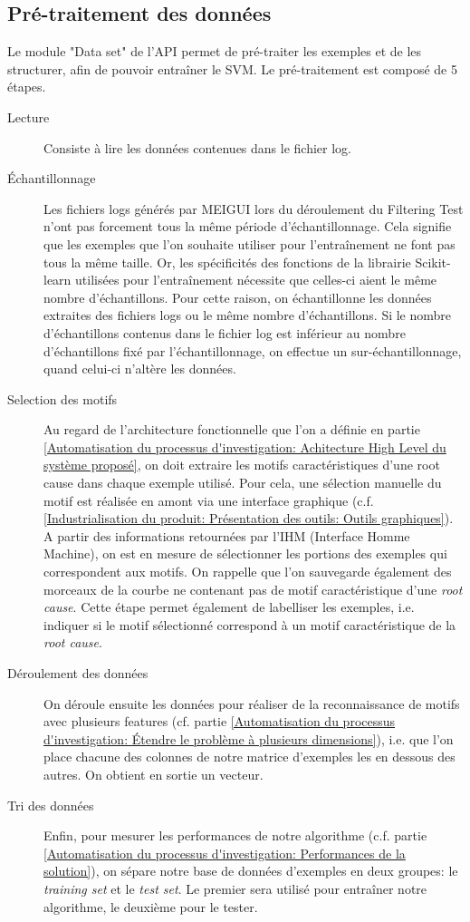 \subsection{Pré-traitement des données}
\label{Industrialisation du produit: API: Pré-traitement et traitement des données}
Le module "Data set" de l'API permet de pré-traiter les exemples et de les structurer, afin de pouvoir entraîner le SVM. 
Le pré-traitement est composé de 5 étapes.
\begin{description}
	\item [Lecture] Consiste à lire les données contenues dans le fichier log. 
	\item [Échantillonnage] Les fichiers logs générés par MEIGUI lors du déroulement du Filtering Test n'ont pas forcement tous la même période d'échantillonnage. Cela signifie que les exemples que l'on souhaite utiliser pour l'entraînement ne font pas tous la même taille. Or, les spécificités des fonctions de la librairie Scikit-learn utilisées pour l'entraînement nécessite que celles-ci aient le même nombre d'échantillons. Pour cette raison, on échantillonne les données extraites des fichiers logs ou le même nombre d'échantillons. Si le nombre d'échantillons contenus dans le fichier log est inférieur au nombre d'échantillons fixé par l'échantillonnage, on effectue un sur-échantillonnage, quand celui-ci n'altère les données. 
	\item [Selection des motifs] Au regard de l'architecture fonctionnelle que l'on a définie en partie \ref{Automatisation du processus d'investigation: Achitecture High Level du système proposé}, on doit extraire les motifs caractéristiques d'une root cause dans chaque exemple utilisé. Pour cela, une sélection manuelle du motif est réalisée en amont via une interface graphique (c.f. \ref{Industrialisation du produit: Présentation des outils: Outils graphiques}). A partir des informations retournées par l'IHM (Interface Homme Machine), on est en mesure de sélectionner les portions des exemples qui correspondent aux motifs. On rappelle que l'on sauvegarde également des morceaux de la courbe ne contenant pas de motif caractéristique d'une \emph{root cause}. Cette étape permet également de labelliser les exemples, i.e. indiquer si le motif sélectionné correspond à un motif caractéristique de la \emph{root cause}.
	\item [Déroulement des données] On déroule ensuite les données pour réaliser de la reconnaissance de motifs avec plusieurs features (cf. partie \ref{Automatisation du processus d'investigation: Étendre le problème à plusieurs dimensions}), i.e. que l'on place chacune des colonnes de notre matrice d'exemples les en dessous des autres. On obtient en sortie un vecteur. 
	\item [Tri des données] Enfin, pour mesurer les performances de notre algorithme (c.f. partie \ref{Automatisation du processus d'investigation: Performances de la solution}), on sépare notre base de données d'exemples en deux groupes: le \emph{training set} et le \emph{test set}. Le premier sera utilisé pour entraîner notre algorithme, le deuxième pour le tester. 
\end{description}

